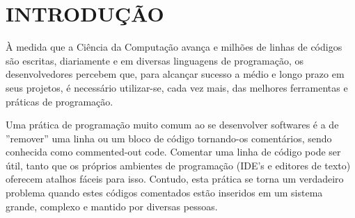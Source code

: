 \documentclass{abnt}
\begin{document}








 


\folhaderosto 








\chapter{INTRODUÇÃO}

À medida que a Ciência da Computação avança e milhões de linhas de códigos são 
escritas, diariamente e em diversas linguagens de programação, os desenvolvedores 
percebem que, para alcançar sucesso a médio e longo prazo em seus projetos, é
necessário utilizar-se, cada vez mais, das melhores ferramentas e práticas de 
programação. 

Uma prática de programação muito comum ao se desenvolver softwares é a de 
''remover'' uma linha ou um bloco de código tornando-os comentários, sendo conhecida  
como commented-out code. Comentar uma linha de código pode ser útil, tanto que 
os próprios ambientes de programação (IDE's e editores de texto) oferecem atalhos 
fáceis para isso. Contudo, esta prática se torna um verdadeiro problema quando 
estes códigos comentados estão inseridos em um sistema grande, complexo e
mantido por diversas pessoas.
\end{document}
